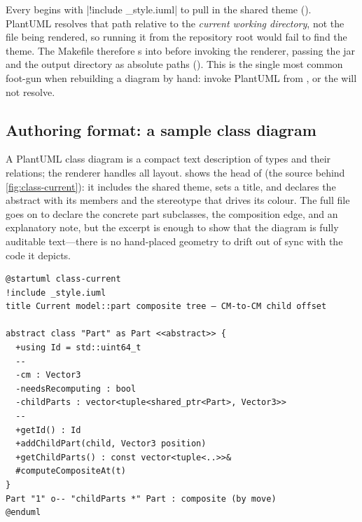 \begin{keyinsight}
Every  begins with \cppinline|!include _style.iuml| to pull in the shared theme
(). PlantUML resolves that path relative to the
\emph{current working directory}, not the file being rendered, so running it from the
repository root would fail to find the theme. The Makefile therefore s into
 before invoking the renderer, passing the jar and the output directory as
absolute paths (). This is the single most common foot-gun when rebuilding
a diagram by hand: invoke PlantUML from , or the  will not
resolve.
\end{keyinsight}

\subsection{Authoring format: a sample class diagram}

A PlantUML class diagram is a compact text description of types and their relations; the
renderer handles all layout.  shows the head of
 (the source behind \cref{fig:class-current}): it includes
the shared theme, sets a title, and declares the abstract  with its members and
the stereotype that drives its colour. The full file goes on to declare the concrete part
subclasses, the composition edge, and an explanatory note, but the excerpt is enough to show
that the diagram is fully auditable text---there is no hand-placed geometry to drift out of
sync with the code it depicts.

\begin{listing}[htbp]
\begin{verbatim}
@startuml class-current
!include _style.iuml
title Current model::part composite tree — CM-to-CM child offset

abstract class "Part" as Part <<abstract>> {
  +using Id = std::uint64_t
  --
  -cm : Vector3
  -needsRecomputing : bool
  -childParts : vector<tuple<shared_ptr<Part>, Vector3>>
  --
  +getId() : Id
  +addChildPart(child, Vector3 position)
  +getChildParts() : const vector<tuple<..>>&
  #computeCompositeAt(t)
}
Part "1" o-- "childParts *" Part : composite (by move)
@enduml
\end{verbatim}
\caption{Head of \texttt{diagrams/class-current.puml}: a PlantUML class diagram is plain
text, themed by \texttt{!include \_style.iuml} and rendered to SVG then PDF by the Makefile.}
\label{lst:puml-sample}
\end{listing}

